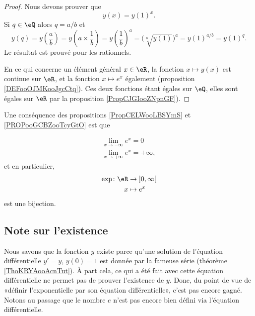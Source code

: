 \begin{proof}
    Nous devons prouver que
    \begin{equation}
        y(x)=y(1)^x.
    \end{equation}
    Si \( q\in \eQ\) alors \( q=a/b\) et
    \begin{equation}
        y(q)=y\left( \frac{ a }{ b } \right)=y\left( a\times \frac{1}{ b } \right)=y\left( \frac{1}{ b } \right)^a=\big( \sqrt[b]{y(1)} \big)^a=y(1)^{a/b}=y(1)^{q}.
    \end{equation}
    Le résultat est prouvé pour les rationnels.

    En ce qui concerne un élément général \( x\in \eR\), la fonction \( x\mapsto y(x)\) est continue sur \( \eR\), et la fonction \( x\mapsto e^x\) également (proposition \ref{DEFooOJMKooJgcCtq}). Ces deux fonctions étant égales sur \( \eQ\), elles sont égales sur \( \eR\) par la proposition  \ref{PropCJGIooZNpnGF}).
\end{proof}

Une conséquence des propositions \ref{PropCELWooLBSYmS} et \ref{PROPooGCBZooTcyGtO} est que 

\begin{subequations}    \label{EqLOIUooHxnEDn}
    \begin{align}
        \lim_{x\to -\infty}  e^{x}=0\\
        \lim_{x\to +\infty}  e^{x}=+\infty,
    \end{align}
\end{subequations}
et en particulier, 
\begin{equation}
    \begin{aligned}
    \exp\colon \eR&\to \mathopen] 0 , \infty \mathclose[ \\
        x&\mapsto  e^{x} 
    \end{aligned}
\end{equation}
est une bijection.

\subsection{Note sur l'existence}

Nous savons que la fonction \( y\) existe parce qu'une solution de l'équation différentielle \( y'=y\), \( y(0)=1\) est donnée par la fameuse série (théorème \ref{ThoKRYAooAcnTut}). À part cela, ce qui a été fait avec cette équation différentielle ne permet pas de prouver l'existence de \( y\). Donc, du point de vue de «définir l'exponentielle par son équation différentielle», c'est pas encore gagné. Notons au passage que le nombre \( e\) n'est pas encore bien défini via l'équation différentielle.

